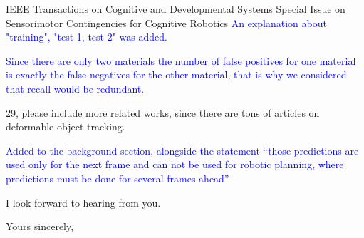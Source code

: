 \documentclass[a4paper,12pt]{letter}
\newcommand{\comment}[1]{\textcolor{blue}{#1}}
\begin{document}
\begin{letter}{IEEE Transactions on Cognitive and Developmental Systems\newline
Special Issue on Sensorimotor Contingencies for Cognitive Robotics}
\comment{An explanation about "training", "test 1, test 2" was added.}

\comment{Since there are only two materials the number of false positives for one material is exactly the false negatives for the other material, that is why we considered that recall would be redundant.}

29, please include more related works, since there are tons of articles on deformable object tracking.

\comment{Added to the background section, alongside the statement ``those predictions are used only for the next frame and can not be used for robotic planning, where predictions must be done for several frames ahead''}


I look forward to hearing from you.


\signature{Dra. Verónica Esther Arriola Ríos\\
Profesora Asociada C de T.C.\newline
Departamento de Matemáticas, Cub 119.\newline
Facultad de Ciencias, UNAM \newline
v.arriola@ciencias.unam.mx \newline
+(52)55 5622 5426}

\closing{Yours sincerely,}


\end{letter}
\end{document}
